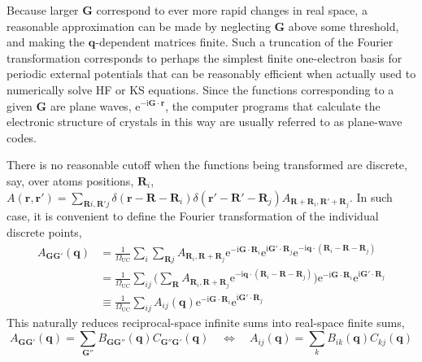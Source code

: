 Because larger $\mathbf G$ correspond to ever more rapid changes in real space, a reasonable approximation can be made by neglecting $\mathbf G$ above some threshold, and making the $\mathbf q$-dependent matrices finite.
Such a truncation of the Fourier transformation corresponds to perhaps the simplest finite one-electron basis for periodic external potentials that can be reasonably efficient when actually used to numerically solve HF or KS equations.
Since the functions corresponding to a given $\mathbf G$ are plane waves, $\mathrm e^{-\mathrm i\mathbf G\cdot\mathbf r}$, the computer programs that calculate the electronic structure of crystals in this way are usually referred to as plane-wave codes.

There is no reasonable cutoff when the functions being transformed are discrete, say, over atoms positions, $\mathbf R_i$, $A(\mathbf r,\mathbf r')=\sum_{\mathbf Ri,\mathbf R'j}\delta(\mathbf r-\mathbf R-\mathbf R_i)\delta(\mathbf r'-\mathbf R'-\mathbf R_j)A_{\mathbf R+\mathbf R_i,\mathbf R'+\mathbf R_j}$.
In such case, it is convenient to define the Fourier transformation of the individual discrete points,
\begin{equation}
\begin{aligned}
  A_{\mathbf G\mathbf G'}(\mathbf q)&=\frac1{\Omega_\text{UC}}\sum_i\sum_{\mathbf Rj}A_{\mathbf R_i,\mathbf R+\mathbf R_j}\mathrm e^{-\mathrm i\mathbf G\cdot\mathbf R_i}\mathrm e^{\mathrm i\mathbf G'\cdot\mathbf R_j}\mathrm e^{-\mathrm i\mathbf q\cdot(\mathbf R_i-\mathbf R-\mathbf R_j)} \\
  &=\frac1{\Omega_\text{UC}}\sum_{ij}\Big(\sum_\mathbf RA_{\mathbf R_i,\mathbf R+\mathbf R_j}\mathrm e^{-\mathrm i\mathbf q\cdot(\mathbf R_i-\mathbf R-\mathbf R_j)}\Big)\mathrm e^{-\mathrm i\mathbf G\cdot\mathbf R_i}\mathrm e^{\mathrm i\mathbf G'\cdot\mathbf R_j} \\
  &\equiv\frac1{\Omega_\text{UC}}\sum_{ij}A_{ij}(\mathbf q)\mathrm e^{-\mathrm i\mathbf G\cdot\mathbf R_i}\mathrm e^{\mathrm i\mathbf G'\cdot\mathbf R_j}
\end{aligned}
\end{equation}
This naturally reduces reciprocal-space infinite sums into real-space finite sums,
\begin{equation}
  A_{\mathbf G\mathbf G'}(\mathbf q)=\sum_{\mathbf G''}B_{\mathbf G\mathbf G''}(\mathbf q)C_{\mathbf G''\mathbf G'}(\mathbf q) \quad\Leftrightarrow\quad
  A_{ij}(\mathbf q)=\sum_k B_{ik}(\mathbf q)C_{kj}(\mathbf q)
  \label{eq:fourier-discrete}
\end{equation}

